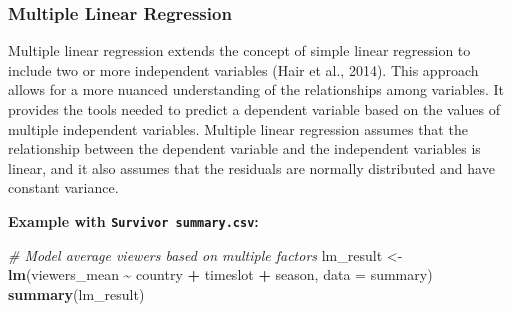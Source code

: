 \documentclass[
  b5paper]{book}
\newenvironment{Shaded}{\begin{snugshade}}{\end{snugshade}}
\newcommand{\AttributeTok}[1]{\textcolor[rgb]{0.13,0.29,0.53}{#1}}
\newcommand{\CommentTok}[1]{\textcolor[rgb]{0.56,0.35,0.01}{\textit{#1}}}
\newcommand{\FunctionTok}[1]{\textcolor[rgb]{0.13,0.29,0.53}{\textbf{#1}}}
\newcommand{\NormalTok}[1]{#1}
\newcommand{\OtherTok}[1]{\textcolor[rgb]{0.56,0.35,0.01}{#1}}
\newcommand{\SpecialCharTok}[1]{\textcolor[rgb]{0.81,0.36,0.00}{\textbf{#1}}}
\begin{document}
\hypertarget{multiple-linear-regression}{%
\subsubsection*{Multiple Linear Regression}\label{multiple-linear-regression}}

Multiple linear regression extends the concept of simple linear regression to include two or more independent variables (Hair et al., 2014). This approach allows for a more nuanced understanding of the relationships among variables. It provides the tools needed to predict a dependent variable based on the values of multiple independent variables. Multiple linear regression assumes that the relationship between the dependent variable and the independent variables is linear, and it also assumes that the residuals are normally distributed and have constant variance.

\textbf{Example with \texttt{Survivor\ summary.csv}:}

\begin{Shaded}
\begin{Highlighting}[]
\CommentTok{\# Model average viewers based on multiple factors}
\NormalTok{lm\_result }\OtherTok{\textless{}{-}} \FunctionTok{lm}\NormalTok{(viewers\_mean }\SpecialCharTok{\textasciitilde{}}\NormalTok{ country }\SpecialCharTok{+}\NormalTok{ timeslot }\SpecialCharTok{+}\NormalTok{ season, }\AttributeTok{data =}\NormalTok{ summary)}
\FunctionTok{summary}\NormalTok{(lm\_result)}
\end{Highlighting}
\end{Shaded}
\end{document}

